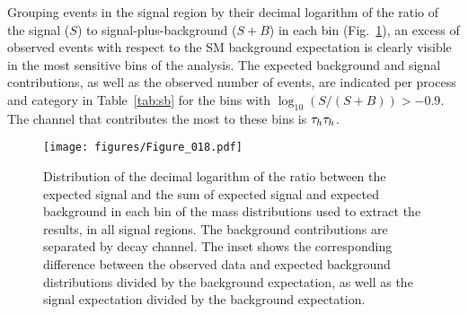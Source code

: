 Grouping events
in the signal region by their decimal logarithm of the ratio of the signal ($S$) to signal-plus-background ($S+B$) in each bin (Fig.~\ref{fig:sb}), an excess of observed events with respect to the SM background expectation is clearly visible in the most sensitive bins of the analysis. The expected background and signal contributions, as well as the observed number of events, are indicated per process and category in Table~\ref{tab:sb} for the bins with $\log_{10}(S/(S+B))>-0.9$. The channel that contributes the most to these bins is $\tau_{h}\tau_{h}$.

\begin{figure}[htb]
  \centering
    \texttt{[image: figures/Figure\_018.pdf]}
   \caption{Distribution of the decimal logarithm of the ratio between the expected signal and the sum of expected signal and expected background in each bin of the mass distributions used to extract the results, in all signal regions. The background contributions are separated by decay channel. The inset shows the corresponding difference between the observed data and expected background distributions divided by the background expectation, as well as the signal expectation divided by the background expectation.
   }
    \label{fig:sb}

\end{figure}

